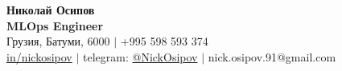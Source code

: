 \documentclass[letterpaper,12pt,english,russian]{fed-res} %
\begin{document}
\begin{center}
    \textbf{\Huge Николай Осипов} \\ \vspace{1pt}
    \textbf{MLOps Engineer} \\ \vspace{1pt}
    Грузия, Батуми, 6000 $|$ +995 598 593 374 \\ \vspace{1pt} 
    \href{https://www.linkedin.com/in/nickosipov/}{in/nickosipov} $|$ telegram: \href{https://t.me/NickOsipov}{@NickOsipov} $|$ nick.osipov.91@gmail.com \\ \vspace{1pt}
\end{center}







\end{document}
